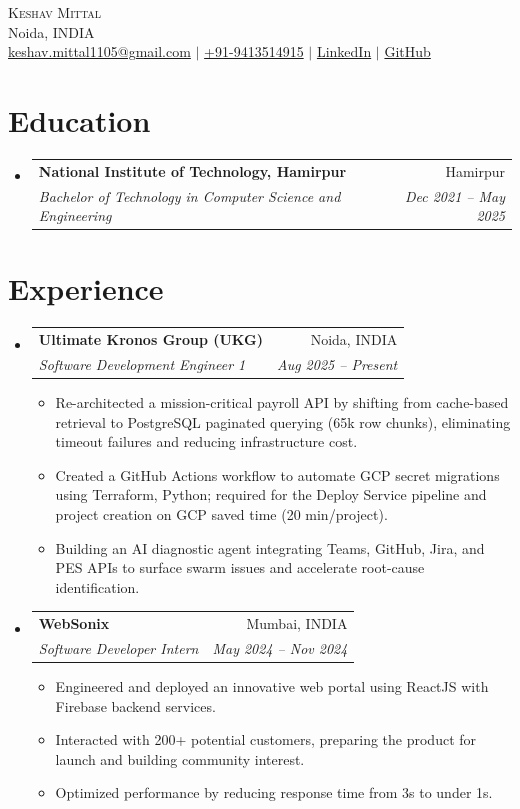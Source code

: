 \documentclass[letterpaper,11pt]{article}
\makeatletter
\newcommand{\resumeItem}[1]{
  \item\small{
    {#1 \vspace{-2pt}}
  }
}
\newcommand{\resumeSubheading}[4]{
  \vspace{-1pt}\item
    \begin{tabular*}{0.97\textwidth}[t]{l@{\extracolsep{\fill}}r}
      \textbf{#1} & #2 \\
      \textit{\small#3} & \textit{\small #4} \\
    \end{tabular*}\vspace{-7pt}
}
\newcommand{\resumeSubHeadingListStart}{\begin{itemize}[leftmargin=0.15in, label={}]}
\newcommand{\resumeSubHeadingListEnd}{\end{itemize}}
\newcommand{\resumeItemListStart}{\begin{itemize}}
\newcommand{\resumeItemListEnd}{\end{itemize}\vspace{-5pt}}
\makeatother
\begin{document}
\begin{center}
    {\Huge \scshape Keshav Mittal} \\ \vspace{1pt}
    Noida, INDIA \\ 
    \small \href{mailto:keshav.mittal1105@gmail.com}{keshav.mittal1105@gmail.com} $|$ 
    \href{tel:+91-9413514915}{+91-9413514915} $|$ 
    \href{https://linkedin.com/in/keshav-mittal}{LinkedIn} $|$
    \href{https://github.com/keshav-mittal}{GitHub}
\end{center}


\section{Education}
\resumeSubHeadingListStart

      \resumeSubheading
      {National Institute of Technology, Hamirpur}{Hamirpur}
      {Bachelor of Technology in Computer Science and Engineering}{Dec 2021 -- May 2025}
      \resumeSubHeadingListEnd

\section{Experience}
\resumeSubHeadingListStart

      \resumeSubheading
      {Ultimate Kronos Group (UKG)}{Noida, INDIA}
      {Software Development Engineer 1}{Aug 2025 -- Present}
      \resumeItemListStart
      \resumeItem{Re-architected a mission-critical payroll API by shifting from cache-based retrieval to PostgreSQL paginated querying (65k row chunks), eliminating timeout failures and reducing infrastructure cost.}
\resumeItem{Created a GitHub Actions workflow to automate GCP secret migrations using Terraform, Python; required for the Deploy Service pipeline and project creation on GCP saved time (20 min/project).}
\resumeItem{Building an AI diagnostic agent integrating Teams, GitHub, Jira, and PES APIs to surface swarm issues and accelerate root-cause identification.}
\resumeItemListEnd

      \resumeSubheading
      {WebSonix}{Mumbai, INDIA}
      {Software Developer Intern}{May 2024 -- Nov 2024}
      \resumeItemListStart
      \resumeItem{Engineered and deployed an innovative web portal using ReactJS with Firebase backend services.}
\resumeItem{Interacted with 200+ potential customers, preparing the product for launch and building community interest.}
\resumeItem{Optimized performance by reducing response time from 3s to under 1s.}
\resumeItemListEnd
\resumeSubHeadingListEnd
\end{document}

